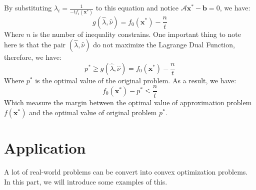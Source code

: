 \documentclass[10pt,a4paper]{article}
\begin{document}
By substituting $\hat{\lambda}_{i} =  \frac{1}{-tf_{i}(\mathbf{x}^{*})}$ to this equation and notice $\mathcal{A} \mathbf{x}^{*} - \mathbf{b} = 0$, we have:
\begin{equation*}
	g(\hat{\lambda}, \hat{\nu}) = f_{0}(\mathbf{x^{*}}) - \frac{n}{t}
\end{equation*}
Where $n$ is the number of inequality constrains. One important thing to note here is that the pair $(\hat{\lambda}, \hat{\nu})$ do not maximize the Lagrange Dual Function, therefore, we have:
\begin{equation*}
	p^{*} \geq g(\hat{\lambda}, \hat{\nu}) = f_{0}(\mathbf{x^{*}}) - \frac{n}{t}
\end{equation*}
Where $p^{*}$ is the optimal value of the original problem. As a result, we have:
\begin{equation*}
	f_{0}(\mathbf{x^{*}}) - p^{*} \leq \frac{n}{t}
\end{equation*}
Which measure the margin between the optimal value of approximation problem $f(\mathbf{x}^{*})$ and the optimal value of original problem $p^{*}$.
\section{Application}
A lot of real-world problems can be convert into convex optimization problems. In this part, we will introduce some examples of this.
\end{document}
